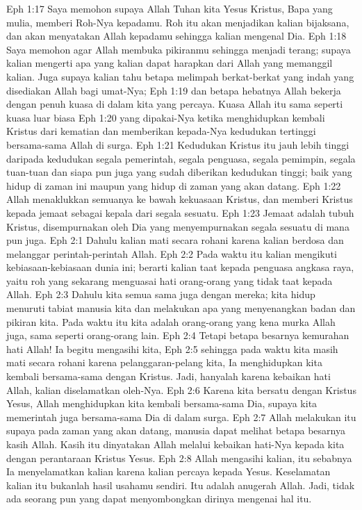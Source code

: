 Eph 1:17  Saya memohon supaya Allah Tuhan kita Yesus Kristus, Bapa yang mulia, memberi Roh-Nya kepadamu. Roh itu akan menjadikan kalian bijaksana, dan akan menyatakan Allah kepadamu sehingga kalian mengenal Dia.
Eph 1:18  Saya memohon agar Allah membuka pikiranmu sehingga menjadi terang; supaya kalian mengerti apa yang kalian dapat harapkan dari Allah yang memanggil kalian. Juga supaya kalian tahu betapa melimpah berkat-berkat yang indah yang disediakan Allah bagi umat-Nya;
Eph 1:19  dan betapa hebatnya Allah bekerja dengan penuh kuasa di dalam kita yang percaya. Kuasa Allah itu sama seperti kuasa luar biasa
Eph 1:20  yang dipakai-Nya ketika menghidupkan kembali Kristus dari kematian dan memberikan kepada-Nya kedudukan tertinggi bersama-sama Allah di surga.
Eph 1:21  Kedudukan Kristus itu jauh lebih tinggi daripada kedudukan segala pemerintah, segala penguasa, segala pemimpin, segala tuan-tuan dan siapa pun juga yang sudah diberikan kedudukan tinggi; baik yang hidup di zaman ini maupun yang hidup di zaman yang akan datang.
Eph 1:22  Allah menaklukkan semuanya ke bawah kekuasaan Kristus, dan memberi Kristus kepada jemaat sebagai kepala dari segala sesuatu.
Eph 1:23  Jemaat adalah tubuh Kristus, disempurnakan oleh Dia yang menyempurnakan segala sesuatu di mana pun juga.
Eph 2:1  Dahulu kalian mati secara rohani karena kalian berdosa dan melanggar perintah-perintah Allah.
Eph 2:2  Pada waktu itu kalian mengikuti kebiasaan-kebiasaan dunia ini; berarti kalian taat kepada penguasa angkasa raya, yaitu roh yang sekarang menguasai hati orang-orang yang tidak taat kepada Allah.
Eph 2:3  Dahulu kita semua sama juga dengan mereka; kita hidup menuruti tabiat manusia kita dan melakukan apa yang menyenangkan badan dan pikiran kita. Pada waktu itu kita adalah orang-orang yang kena murka Allah juga, sama seperti orang-orang lain.
Eph 2:4  Tetapi betapa besarnya kemurahan hati Allah! Ia begitu mengasihi kita,
Eph 2:5  sehingga pada waktu kita masih mati secara rohani karena pelanggaran-pelang kita, Ia menghidupkan kita kembali bersama-sama dengan Kristus. Jadi, hanyalah karena kebaikan hati Allah, kalian diselamatkan oleh-Nya.
Eph 2:6  Karena kita bersatu dengan Kristus Yesus, Allah menghidupkan kita kembali bersama-sama Dia, supaya kita memerintah juga bersama-sama Dia di dalam surga.
Eph 2:7  Allah melakukan itu supaya pada zaman yang akan datang, manusia dapat melihat betapa besarnya kasih Allah. Kasih itu dinyatakan Allah melalui kebaikan hati-Nya kepada kita dengan perantaraan Kristus Yesus.
Eph 2:8  Allah mengasihi kalian, itu sebabnya Ia menyelamatkan kalian karena kalian percaya kepada Yesus. Keselamatan kalian itu bukanlah hasil usahamu sendiri. Itu adalah anugerah Allah. Jadi, tidak ada seorang pun yang dapat menyombongkan dirinya mengenai hal itu.
